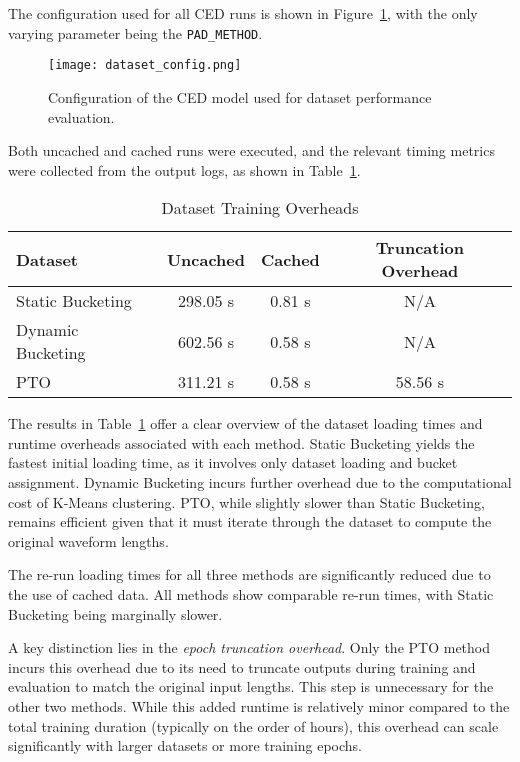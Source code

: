 The configuration used for all CED runs is shown in Figure~\ref{fig:dataset_config}, with the only varying parameter being the \texttt{PAD\_METHOD}.

\begin{figure}[H]
    \centering
    \texttt{[image: dataset\_config.png]}
    \caption{\label{fig:dataset_config} Configuration of the CED model used for dataset performance evaluation.}
\end{figure}

Both uncached and cached runs were executed, and the relevant timing metrics were collected from the output logs, as shown in Table~\ref{tab:dataset_loading_times}.

\vspace{1em}
\begin{table}[H]
\centering
\caption{Dataset Training Overheads}
\label{tab:dataset_loading_times}
\begin{tabular}{|l|c|c|c|}
\hline
\textbf{Dataset} & \textbf{Uncached} & \textbf{Cached} & \textbf{Truncation Overhead} \\
\hline
Static Bucketing  & 298.05 s  & 0.81 s   & N/A    \\
Dynamic Bucketing & 602.56 s& 0.58 s  & N/A    \\
PTO               & 311.21 s & 0.58 s  & 58.56 s  \\
\hline
\end{tabular}
\end{table}

The results in Table~\ref{tab:dataset_loading_times} offer a clear overview of the dataset loading times and runtime overheads associated with each method. Static Bucketing yields the fastest initial loading time, as it involves only dataset loading and bucket assignment. Dynamic Bucketing incurs further overhead due to the computational cost of K-Means clustering. PTO, while slightly slower than Static Bucketing, remains efficient given that it must iterate through the dataset to compute the original waveform lengths.

The re-run loading times for all three methods are significantly reduced due to the use of cached data. All methods show comparable re-run times, with Static Bucketing being marginally slower.

A key distinction lies in the \textit{epoch truncation overhead}. Only the PTO method incurs this overhead due to its need to truncate outputs during training and evaluation to match the original input lengths. This step is unnecessary for the other two methods. While this added runtime is relatively minor compared to the total training duration (typically on the order of hours), this overhead can scale significantly with larger datasets or more training epochs.


